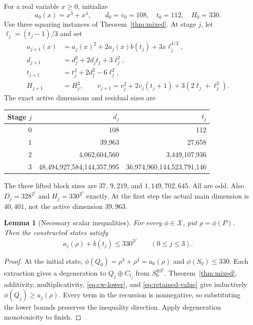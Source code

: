 \documentclass[11pt]{article}
\newtheorem{lemma}[theorem]{Lemma}
\theoremstyle{definition}\newtheorem{definition}[theorem]{Definition}
\theoremstyle{remark}\newtheorem{remark}[theorem]{Remark}
\newcommand{\X}{\mathcal X}
\begin{document}
For a real variable $x\geq0$, initialize
\begin{equation}\label{eq:scalar-initial}
 a_0(x)=x^3+x^4,\qquad d_0=v_0=108,\quad t_0=112,\quad H_0=330.
\end{equation}
Use three squaring instances of Theorem~\ref{thm:mixed}. At stage $j$, let $\ell_j=(t_j-1)/3$ and set
\begin{align}
 a_{j+1}(x)&=a_j(x)^2+2a_j(x)b(t_j)+3x\ell_j^{4/3},\label{eq:a-recur}\\
 d_{j+1}&=d_j^2+2d_jt_j+3\ell_j^2,\label{eq:d-recur}\\
 t_{j+1}&=t_j^2+2d_j^2-6\ell_j^2,\label{eq:t-recur}\\
 H_{j+1}&=H_j^2,\qquad
 v_{j+1}=v_j^2+2v_j(t_j+1)+3(2\ell_j+\ell_j^2).\label{eq:Hv-recur}
\end{align}
The exact active dimensions and residual sizes are
\begin{center}\small
\begin{tabular}{r r r}
\toprule
Stage $j$ & $d_j$ & $t_j$\\\midrule
0 &108&112\\
1 &39,963&27,658\\
2 &4,062,604,560&3,449,107,936\\
3 &48,494,927,584,144,357,995&36,974,960,144,523,791,146\\
\bottomrule
\end{tabular}
\end{center}
The three lifted block sizes are $37$, $9{,}219$, and $1{,}149{,}702{,}645$. All are odd. Also $D_j=328^{2^j}$ and $H_j=330^{2^j}$ exactly. At the first step the actual main dimension is $40{,}401$, not the active dimension $39{,}963$.

\begin{lemma}[Necessary scalar inequalities]\label{lem:scalar}
For every $\phi\in\X$, put $\rho=\phi(P)$. Then the constructed states satisfy
\begin{equation}\label{eq:scalar-necessary}
 a_j(\rho)+b(t_j)\leq330^{2^j}\qquad(0\leq j\leq3).
\end{equation}
\end{lemma}
\begin{proof}
At the initial state, $\phi(Q_0)=\rho^3+\rho^4=a_0(\rho)$ and $\phi(S_0)\leq330$. Each extraction gives a degeneration to $Q_j\oplus C_{t_j}$ from $S_0^{\otimes2^j}$. Theorem~\ref{thm:mixed}, additivity, multiplicativity, \eqref{eq:cw-lower}, and \eqref{eq:retained-value} give inductively $\phi(Q_j)\geq a_j(\rho)$. Every term in the recursion is nonnegative, so substituting the lower bounds preserves the inequality direction. Apply degeneration monotonicity to finish.
\end{proof}
\end{document}

